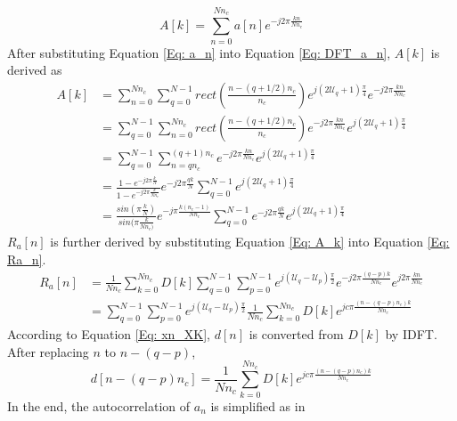 \documentclass[draftcls,onecolumn]{IEEEtran}  %
\begin{document}
\begin{equation}\label{Eq: DFT_a_n}
A[k] = \sum\limits_{n=0}^{Nn_c} a[n]e^{-j2\pi \frac{kn}{Nn_c}}
\end{equation}
After substituting Equation \ref{Eq: a_n} into Equation \ref{Eq: DFT_a_n}, $A[k]$ is derived as
\begin{equation}\label{Eq: A_k}
\begin{split}
A[k] &= \sum\limits_{n=0}^{Nn_c} \sum\limits_{q=0}^{N-1} rect(\frac{n-(q+1/2)n_c}{n_c}) e^{j(2\mathcal{U}_q+1)\frac{\pi}{4}} e^{-j2\pi \frac{kn}{Nn_c}} \\ 
     &= \sum\limits_{q=0}^{N-1} \sum\limits_{n=0}^{Nn_c} rect(\frac{n-(q+1/2)n_c}{n_c}) e^{-j2\pi \frac{kn}{Nn_c}} e^{j(2\mathcal{U}_q+1)\frac{\pi}{4}} \\ 
     &= \sum\limits_{q=0}^{N-1} \sum\limits_{n=qn_c}^{(q+1)n_c} e^{-j2\pi \frac{kn}{Nn_c}} e^{j(2\mathcal{U}_q+1)\frac{\pi}{4}} \\
     &= \frac{1-e^{-j2\pi\frac{k}{N}}} {1-e^{-j2\pi\frac{k}{Nn_c}}} e^{-j2\pi \frac{qk}{N}} \sum\limits_{q=0}^{N-1} e^{j(2\mathcal{U}_q+1)\frac{\pi}{4}} \\
     &= \frac{sin(\pi\frac{k}{N})} {sin(\pi\frac{k}{Nn_c)}} e^{-j\pi \frac{k(n_c-1)}{Nn_c}} \sum\limits_{q=0}^{N-1} e^{-j2\pi \frac{qk}{N}} e^{j(2\mathcal{U}_q+1)\frac{\pi}{4}} 
\end{split}
\end{equation} 
$R_a[n]$ is further derived by substituting Equation \ref{Eq: A_k} into Equation \ref{Eq: Ra_n}.
\begin{equation}\label{Eq: IDFT_Ra1}
\begin{split}
R_a[n] &= \frac{1}{Nn_c}\sum\limits_{k=0}^{Nn_c} D[k] 
\sum\limits_{q=0}^{N-1} \sum\limits_{p=0}^{N-1} 
e^{j(\mathcal{U}_q-\mathcal{U}_p)\frac{\pi}{2}} 
e^{-j2\pi \frac{(q-p)k}{Nn_c}}
e^{j2\pi \frac{kn}{Nn_c}} \\
 &= \sum\limits_{q=0}^{N-1} \sum\limits_{p=0}^{N-1} 
e^{j(\mathcal{U}_q-\mathcal{U}_p)\frac{\pi}{2}} 
\frac{1}{Nn_c}\sum\limits_{k=0}^{Nn_c} D[k] e^{jc\pi \frac{(n-(q-p)n_c) k}{Nn_c}}
\end{split}
\end{equation}
According to Equation \ref{Eq: xn_XK}, $d[n]$ is converted from $D[k]$ by IDFT. After replacing $n$ to $n-(q-p)$, 
\begin{equation}\label{Eq: dn_tmp}
d[n-(q-p)n_c] = \frac{1}{Nn_c} \sum\limits_{k=0}^{Nn_c} D[k] e^{jc\pi \frac{(n-(q-p)n_c) k}{Nn_c}} 
\end{equation}
In the end, the autocorrelation of $a_n$ is simplified as in
\end{document}
